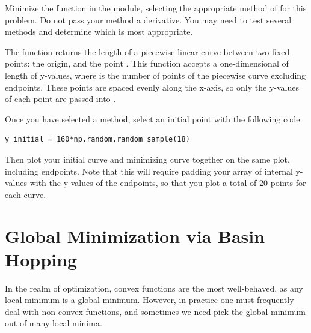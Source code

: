 \begin{problem}
Minimize the function  in the  module, selecting the appropriate method of  for this problem.  
Do not pass your method a derivative. 
You may need to test several methods and determine which is most appropriate.

The function  returns the length of a piecewise-linear curve between two fixed points: the origin, and the point . 
This function accepts a one-dimensional  of length  of y-values, where  is the number of points of the piecewise curve excluding endpoints.
These points are spaced evenly along the x-axis, so only the y-values of each point are passed into .

Once you have selected a method, select an initial point with the following code:

\begin{lstlisting}
y_initial = 160*np.random.random_sample(18)
\end{lstlisting}

Then plot your initial curve and minimizing curve together on the same plot, including endpoints.
Note that this will require padding your array of internal y-values with the y-values of the endpoints, so that you plot a total of 20 points for each curve.
\end{problem}



\section*{Global Minimization via Basin Hopping}

In the realm of optimization, convex functions are the most well-behaved, as any local minimum is a global minimum.
However, in practice one must frequently deal with non-convex functions, and sometimes we need pick the global minimum out of many local minima.

